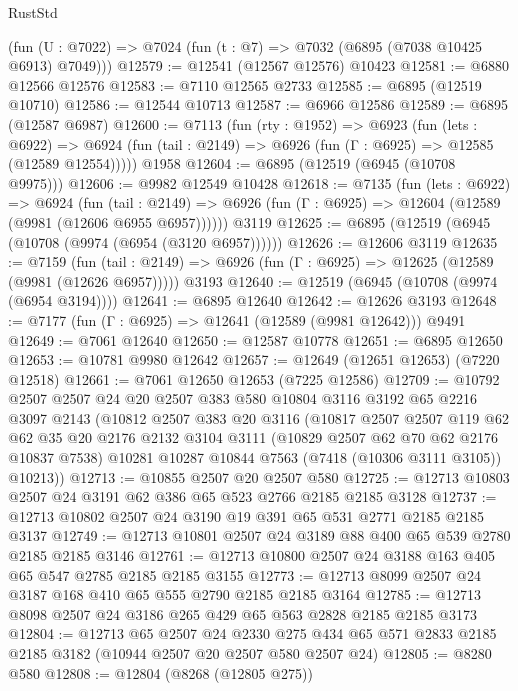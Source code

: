 \begin{lexlean}{RustStd}
\begin{coremodule}
    (fun (U : @7022) => @7024 (fun (t : @7) => @7032 (@6895 (@7038 @10425 @6913) @7049)))
@12579 := @12541 (@12567 @12576) @10423
@12581 := @6880 @12566 @12576
@12583 := @7110 @12565 @2733
@12585 := @6895 (@12519 @10710)
@12586 := @12544 @10713
@12587 := @6966 @12586
@12589 := @6895 (@12587 @6987)
@12600 := @7113
    (fun (rty : @1952) =>
    @6923
      (fun (lets : @6922) =>
      @6924 (fun (tail : @2149) => @6926 (fun (Γ : @6925) => @12585 (@12589 @12554)))))
    @1958
@12604 := @6895 (@12519 (@6945 (@10708 @9975)))
@12606 := @9982 @12549 @10428
@12618 := @7135
    (fun (lets : @6922) =>
    @6924
      (fun (tail : @2149) =>
      @6926 (fun (Γ : @6925) => @12604 (@12589 (@9981 (@12606 @6955 @6957))))))
    @3119
@12625 := @6895 (@12519 (@6945 (@10708 (@9974 (@6954 (@3120 @6957))))))
@12626 := @12606 @3119
@12635 := @7159
    (fun (tail : @2149) => @6926 (fun (Γ : @6925) => @12625 (@12589 (@9981 (@12626 @6957)))))
    @3193
@12640 := @12519 (@6945 (@10708 (@9974 (@6954 @3194))))
@12641 := @6895 @12640
@12642 := @12626 @3193
@12648 := @7177 (fun (Γ : @6925) => @12641 (@12589 (@9981 @12642))) @9491
@12649 := @7061 @12640
@12650 := @12587 @10778
@12651 := @6895 @12650
@12653 := @10781 @9980 @12642
@12657 := @12649 (@12651 @12653) (@7220 @12518)
@12661 := @7061 @12650 @12653 (@7225 @12586)
@12709 := @10792
    @2507
    @2507
    @24
    @20
    @2507
    @383
    @580
    @10804
    @3116
    @3192
    @65
    @2216
    @3097
    @2143
    (@10812
      @2507
      @383
      @20
      @3116
      (@10817
        @2507
        @2507
        @119
        @62
        @62
        @35
        @20
        @2176
        @2132
        @3104
        @3111
        (@10829 @2507 @62 @70 @62 @2176 @10837 @7538)
        @10281
        @10287
        @10844
        @7563
        (@7418 (@10306 @3111 @3105))
        @10213))
@12713 := @10855 @2507 @20 @2507 @580
@12725 := @12713 @10803 @2507 @24 @3191 @62 @386 @65 @523 @2766 @2185 @2185 @3128
@12737 := @12713 @10802 @2507 @24 @3190 @19 @391 @65 @531 @2771 @2185 @2185 @3137
@12749 := @12713 @10801 @2507 @24 @3189 @88 @400 @65 @539 @2780 @2185 @2185 @3146
@12761 := @12713 @10800 @2507 @24 @3188 @163 @405 @65 @547 @2785 @2185 @2185 @3155
@12773 := @12713 @8099 @2507 @24 @3187 @168 @410 @65 @555 @2790 @2185 @2185 @3164
@12785 := @12713 @8098 @2507 @24 @3186 @265 @429 @65 @563 @2828 @2185 @2185 @3173
@12804 := @12713
    @65
    @2507
    @24
    @2330
    @275
    @434
    @65
    @571
    @2833
    @2185
    @2185
    @3182
    (@10944 @2507 @20 @2507 @580 @2507 @24)
@12805 := @8280 @580
@12808 := @12804 (@8268 (@12805 @275))

\end{coremodule}
\end{lexlean}
